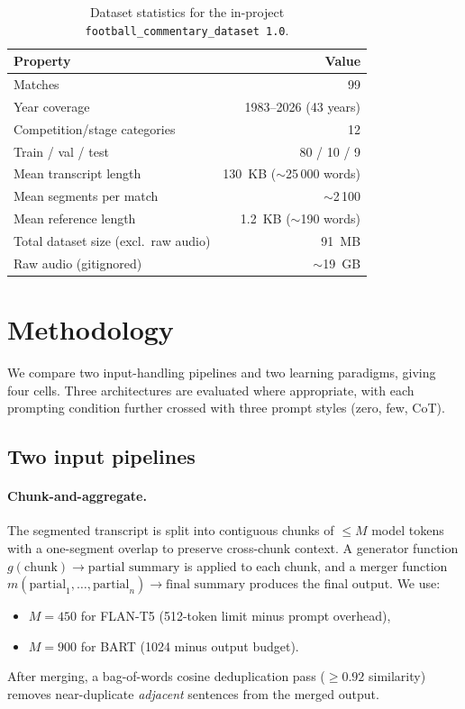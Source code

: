 \documentclass[10pt,a4paper]{article}
\begin{document}
\begin{table}[h]
\centering\small
\begin{tabular}{lr}
\toprule
\textbf{Property} & \textbf{Value} \\
\midrule
Matches & 99 \\
Year coverage & 1983--2026 (43 years) \\
Competition/stage categories & 12 \\
Train / val / test & 80 / 10 / 9 \\
Mean transcript length & 130~KB ($\sim$25\,000 words) \\
Mean segments per match & $\sim$2\,100 \\
Mean reference length & 1.2~KB ($\sim$190 words) \\
Total dataset size (excl.\ raw audio) & 91~MB \\
Raw audio (gitignored) & $\sim$19~GB \\
\bottomrule
\end{tabular}
\caption{Dataset statistics for the in-project \texttt{football\_commentary\_dataset 1.0}.}
\label{tab:dataset}
\end{table}

\section{Methodology}
\label{sec:method}

We compare two input-handling pipelines and two learning paradigms, giving four cells. Three architectures are evaluated where appropriate, with each prompting condition further crossed with three prompt styles (zero, few, CoT).

\subsection{Two input pipelines}

\paragraph{Chunk-and-aggregate.}
The segmented transcript is split into contiguous chunks of $\le M$ model tokens with a one-segment overlap to preserve cross-chunk context. A generator function $g(\text{chunk}) \to \text{partial summary}$ is applied to each chunk, and a merger function $m(\text{partial}_1, \dots, \text{partial}_n) \to \text{final summary}$ produces the final output. We use:
\begin{itemize}[leftmargin=*,itemsep=2pt,topsep=2pt]
\item $M = 450$ for FLAN-T5 (512-token limit minus prompt overhead),
\item $M = 900$ for BART (1024 minus output budget).
\end{itemize}
After merging, a bag-of-words cosine deduplication pass ($\ge 0.92$ similarity) removes near-duplicate \emph{adjacent} sentences from the merged output.
\end{document}
